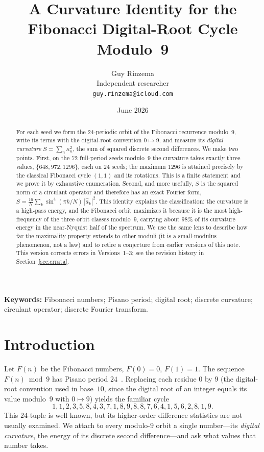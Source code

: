 \documentclass[12pt]{article}
\title{A Curvature Identity for the Fibonacci Digital-Root Cycle Modulo~9}
\author{Guy Rinzema\\
Independent researcher\\
\texttt{guy.rinzema@icloud.com}}
\date{June 2026}
\theoremstyle{remark}
\begin{document}
\maketitle

\begin{abstract}
For each seed we form the $24$-periodic orbit of the Fibonacci recurrence modulo~$9$,
write its terms with the digital-root convention $0\mapsto 9$, and measure its
\emph{digital curvature} $S=\sum_n \kappa_n^2$, the sum of squared discrete second
differences. We make two points. First, on the $72$ full-period seeds modulo~$9$ the
curvature takes exactly three values, $\{648,972,1296\}$, each on $24$ seeds; the maximum
$1296$ is attained precisely by the classical Fibonacci cycle $(1,1)$ and its rotations.
This is a finite statement and we prove it by exhaustive enumeration. Second, and more
usefully, $S$ is the squared norm of a circulant operator and therefore has an exact
Fourier form, $S=\frac{16}{N}\sum_{k}\sin^4(\pi k/N)\,|\hat a_k|^2$. This identity
explains the classification: the curvature is a high-pass energy, and the Fibonacci orbit
maximizes it because it is the most high-frequency of the three orbit classes modulo~$9$,
carrying about $98\%$ of its curvature energy in the near-Nyquist half of the spectrum. We use the same lens to
describe how far the maximality property extends to other moduli (it is a small-modulus
phenomenon, not a law) and to retire a conjecture from earlier versions of this note.
This version corrects errors in Versions~1--3; see the revision history in
Section~\ref{sec:errata}.
\end{abstract}

\noindent\textbf{Keywords:} Fibonacci numbers; Pisano period; digital root;
discrete curvature; circulant operator; discrete Fourier transform.

\section{Introduction}

Let $F(n)$ be the Fibonacci numbers, $F(0)=0$, $F(1)=1$. The sequence $F(n)\bmod 9$ has
Pisano period $24$~\cite{Wall1960}. Replacing each residue $0$ by $9$ (the digital-root
convention used in base~$10$, since the digital root of an integer equals its value
modulo~$9$ with $0\mapsto 9$) yields the familiar cycle
\[
1,1,2,3,5,8,4,3,7,1,8,9,8,8,7,6,4,1,5,6,2,8,1,9.
\]
This $24$-tuple is well known, but its higher-order difference statistics are not usually
examined. We attach to every modulo-$9$ orbit a single number---its \emph{digital
curvature}, the energy of its discrete second difference---and ask what values that number
takes.
\end{document}
